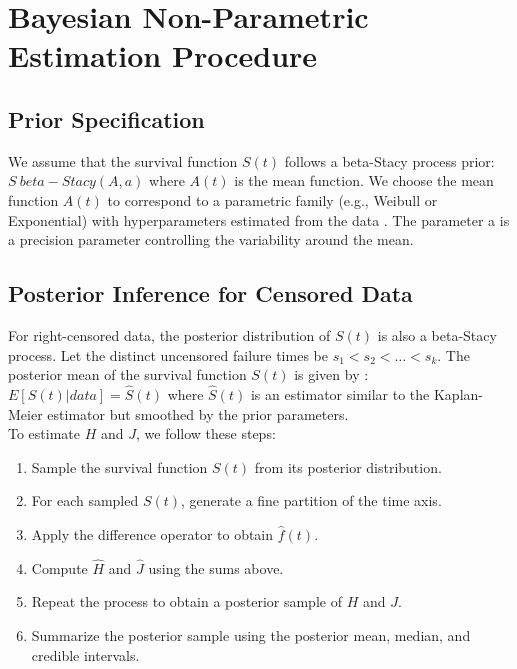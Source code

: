 \documentclass[twoside]{article}
\begin{document}
\section{Bayesian Non-Parametric Estimation Procedure}

\subsection{Prior Specification}
We assume that the survival function 
$S(t)$
follows a beta-Stacy process prior:
$S ~ beta-Stacy(A, a)$
where 
$A(t)$ 
is the mean function. 
We choose the mean function 
$A(t)$ 
to correspond to a parametric family (e.g., Weibull or Exponential) with hyperparameters estimated from the data 
\citep{8}. 
The parameter a is a precision parameter controlling the variability around the mean. 

\subsection{Posterior Inference for Censored Data}
For right-censored data, the posterior distribution of 
$S(t)$
is also a beta-Stacy process. 
Let the distinct uncensored failure times be 
$s_1 < s_2 < \ldots < s_k$. 
The posterior mean of the survival function 
$S(t)$ 
is given by 
\citep{3,6}:
$E[S(t) | data] = \hat{S}(t)$
where 
$\hat{S}(t)$ 
is an estimator similar to the Kaplan-Meier estimator but smoothed by the prior parameters. 
\\
To estimate 
$H$ 
and 
$J$, 
we follow these steps: 
\begin{enumerate}
\item
Sample the survival function 
$S(t)$ 
from its posterior distribution. 
\item
For each sampled 
$S(t)$, 
generate a fine partition of the time axis. 
\item
Apply the difference operator to obtain 
$\hat{f}(t)$. 
\item
Compute 
$\hat{H}$
and 
$\hat{J}$
using the sums above. 
\item
Repeat the process to obtain a posterior sample of 
$H$ 
and 
$J$. 
\item
Summarize the posterior sample using the posterior mean, median, and credible intervals. 
\end{enumerate}
\end{document}
